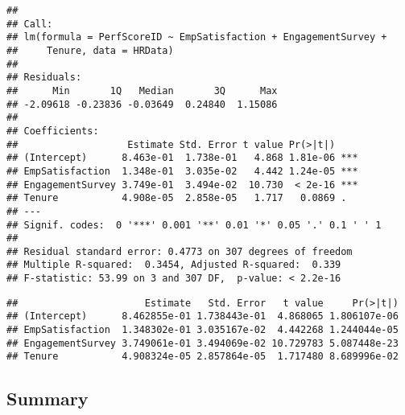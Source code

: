 \documentclass[
]{article}
\newenvironment{Shaded}{\begin{snugshade}}{\end{snugshade}}
\newcommand{\DocumentationTok}[1]{\textcolor[rgb]{0.56,0.35,0.01}{\textbf{\textit{#1}}}}
\newcommand{\FunctionTok}[1]{\textcolor[rgb]{0.13,0.29,0.53}{\textbf{#1}}}
\newcommand{\NormalTok}[1]{#1}
\newcommand{\OtherTok}[1]{\textcolor[rgb]{0.56,0.35,0.01}{#1}}
\newcommand{\SpecialCharTok}[1]{\textcolor[rgb]{0.81,0.36,0.00}{\textbf{#1}}}
\newcommand{\StringTok}[1]{\textcolor[rgb]{0.31,0.60,0.02}{#1}}
\begin{document}
\begin{verbatim}
## 
## Call:
## lm(formula = PerfScoreID ~ EmpSatisfaction + EngagementSurvey + 
##     Tenure, data = HRData)
## 
## Residuals:
##      Min       1Q   Median       3Q      Max 
## -2.09618 -0.23836 -0.03649  0.24840  1.15086 
## 
## Coefficients:
##                   Estimate Std. Error t value Pr(>|t|)    
## (Intercept)      8.463e-01  1.738e-01   4.868 1.81e-06 ***
## EmpSatisfaction  1.348e-01  3.035e-02   4.442 1.24e-05 ***
## EngagementSurvey 3.749e-01  3.494e-02  10.730  < 2e-16 ***
## Tenure           4.908e-05  2.858e-05   1.717   0.0869 .  
## ---
## Signif. codes:  0 '***' 0.001 '**' 0.01 '*' 0.05 '.' 0.1 ' ' 1
## 
## Residual standard error: 0.4773 on 307 degrees of freedom
## Multiple R-squared:  0.3454, Adjusted R-squared:  0.339 
## F-statistic: 53.99 on 3 and 307 DF,  p-value: < 2.2e-16
\end{verbatim}

\begin{Shaded}
\end{Shaded}

\begin{verbatim}
##                      Estimate   Std. Error   t value     Pr(>|t|)
## (Intercept)      8.462855e-01 1.738443e-01  4.868065 1.806107e-06
## EmpSatisfaction  1.348302e-01 3.035167e-02  4.442268 1.244044e-05
## EngagementSurvey 3.749061e-01 3.494069e-02 10.729783 5.087448e-23
## Tenure           4.908324e-05 2.857864e-05  1.717480 8.689996e-02
\end{verbatim}

\subsection{Summary}\label{summary}
\end{document}
